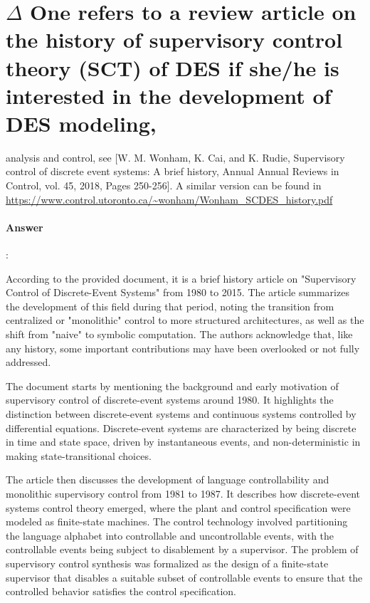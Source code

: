 \documentclass{article}
\begin{document}
\section{$\Delta $ One refers to a review article on the history of supervisory control theory (SCT) of DES if she/he is interested in the development of DES modeling, }

analysis and control, see [W. M. Wonham, K. Cai, and K. Rudie, Supervisory control of discrete event systems: A brief history, Annual Annual Reviews in Control, vol. 45, 2018, Pages 250-256]. A similar version can be found in \url{https://www.control.utoronto.ca/~wonham/Wonham_SCDES_history.pdf}

\paragraph{Answer}:


According to the provided document, it is a brief history article on "Supervisory Control of Discrete-Event Systems" from 1980 to 2015. The article summarizes the development of this field during that period, noting the transition from centralized or "monolithic" control to more structured architectures, as well as the shift from "naive" to symbolic computation. The authors acknowledge that, like any history, some important contributions may have been overlooked or not fully addressed.

The document starts by mentioning the background and early motivation of supervisory control of discrete-event systems around 1980. It highlights the distinction between discrete-event systems and continuous systems controlled by differential equations. Discrete-event systems are characterized by being discrete in time and state space, driven by instantaneous events, and non-deterministic in making state-transitional choices.

The article then discusses the development of language controllability and monolithic supervisory control from 1981 to 1987. It describes how discrete-event systems control theory emerged, where the plant and control specification were modeled as finite-state machines. The control technology involved partitioning the language alphabet into controllable and uncontrollable events, with the controllable events being subject to disablement by a supervisor. The problem of supervisory control synthesis was formalized as the design of a finite-state supervisor that disables a suitable subset of controllable events to ensure that the controlled behavior satisfies the control specification.
\end{document}
